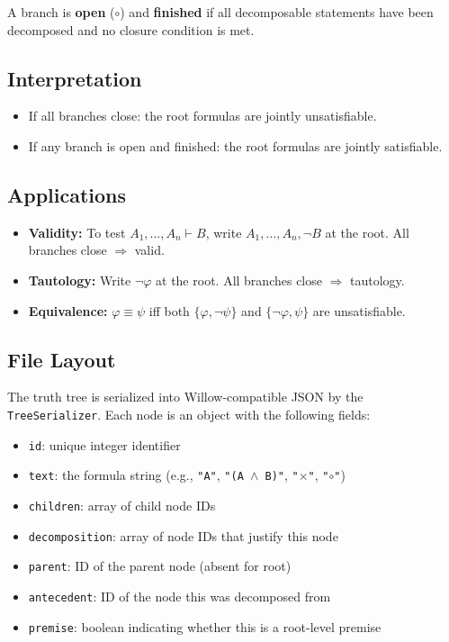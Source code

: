 \documentclass[12pt, letterpaper]{article}
\begin{document}
A branch is \textbf{open} ($\circ$) and \textbf{finished} if all decomposable statements have been decomposed and no closure condition is met.

\subsection*{Interpretation}

\begin{itemize}[nosep]
    \item If all branches close: the root formulas are jointly unsatisfiable.
    \item If any branch is open and finished: the root formulas are jointly satisfiable.
\end{itemize}

\subsection*{Applications}

\begin{itemize}[nosep]
    \item \textbf{Validity:} To test $A_1, \ldots, A_n \vdash B$, write $A_1, \ldots, A_n, \neg B$ at the root. All branches close $\Rightarrow$ valid.
    \item \textbf{Tautology:} Write $\neg\varphi$ at the root. All branches close $\Rightarrow$ tautology.
    \item \textbf{Equivalence:} $\varphi \equiv \psi$ iff both $\{\varphi, \neg\psi\}$ and $\{\neg\varphi, \psi\}$ are unsatisfiable.
\end{itemize}

\subsection*{File Layout}
The truth tree is serialized into Willow-compatible JSON by the \texttt{TreeSerializer}. Each node is an object with the following fields:

\begin{itemize}[nosep]
    \item \texttt{id}: unique integer identifier
    \item \texttt{text}: the formula string (e.g., \texttt{"A"}, \texttt{"(A $\land$ B)"}, \texttt{"$\times$"}, \texttt{"$\circ$"})
    \item \texttt{children}: array of child node IDs
    \item \texttt{decomposition}: array of node IDs that justify this node
    \item \texttt{parent}: ID of the parent node (absent for root)
    \item \texttt{antecedent}: ID of the node this was decomposed from
    \item \texttt{premise}: boolean indicating whether this is a root-level premise
\end{itemize}
\end{document}
